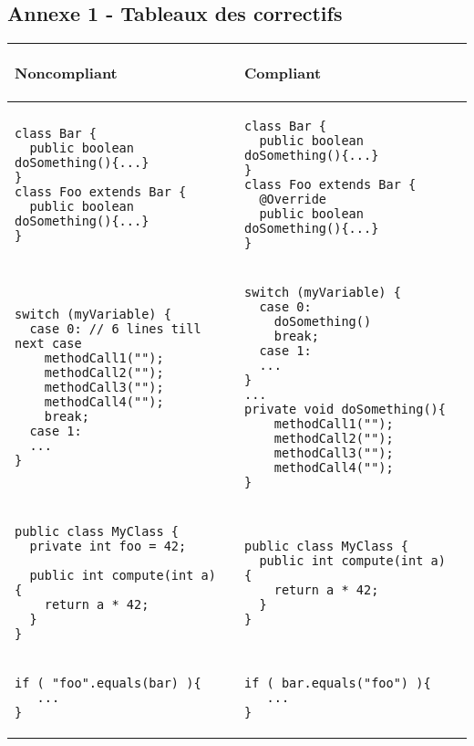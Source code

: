 \documentclass[a4paper]{article}
\begin{document}
\newpage
\appendix
\begin{center}
	\section{Annexe 1 - Tableaux des correctifs}
	\begin{tabular}{|p{}|p{}|}
  	\hline
	  	\begin{center}
	  	 Noncompliant
	  	 \end{center} & 
	  	 \begin{center}
	  	 Compliant
	  	 \end{center} \\
  	\hline
	\begin{lstlisting}
class Bar {
  public boolean doSomething(){...}
}
class Foo extends Bar {
  public boolean doSomething(){...}
}
  	\end{lstlisting} 
   	& 
   	\begin{lstlisting}
class Bar {
  public boolean doSomething(){...}
}
class Foo extends Bar {
  @Override
  public boolean doSomething(){...}
}
  	\end{lstlisting}  \\
  	\hline
	\begin{lstlisting}
switch (myVariable) {
  case 0: // 6 lines till next case
    methodCall1("");
    methodCall2("");
    methodCall3("");
    methodCall4("");
    break;
  case 1:
  ...
}
  	\end{lstlisting} 
   	& 
   	\begin{lstlisting}
switch (myVariable) {
  case 0:                  
    doSomething()
    break;
  case 1:
  ...
}
...
private void doSomething(){
    methodCall1("");
    methodCall2("");
    methodCall3("");
    methodCall4("");
} 
  	\end{lstlisting}  \\
  	\hline
	\begin{lstlisting}
public class MyClass {
  private int foo = 42;

  public int compute(int a) {
    return a * 42;
  }
}
  	\end{lstlisting} 
   	& 
   	\begin{lstlisting}
public class MyClass {
  public int compute(int a) {
    return a * 42;
  }
}
  	\end{lstlisting}  \\
  	\hline
	\begin{lstlisting}
if ( "foo".equals(bar) ){
   ...
}
  	\end{lstlisting} 
   	& 
   	\begin{lstlisting}
if ( bar.equals("foo") ){
   ...
}
  	\end{lstlisting}  \\
  	\hline  	
\end{tabular}  
\end{center} 
\end{document}
